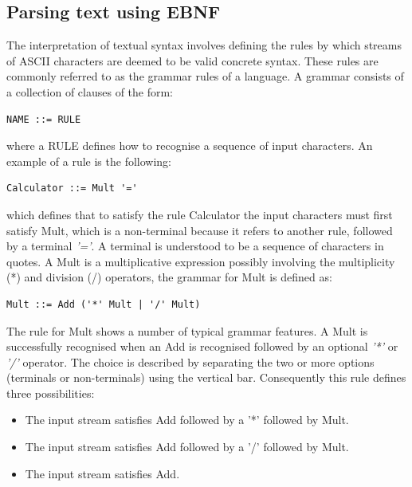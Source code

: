 \subsection{Parsing text using EBNF}

The interpretation of textual syntax involves defining the rules by which streams of ASCII characters are deemed to be valid concrete syntax.  These rules are commonly referred to as the grammar rules of a language.  A grammar consists of a collection of clauses of the form:

\begin{verbatim}
NAME ::= RULE
\end{verbatim}

\noindent where a RULE defines how to recognise a sequence of input characters.  An example of a rule is the following:

\begin{verbatim}
Calculator ::= Mult '='
\end{verbatim}

\noindent which defines that to satisfy the rule Calculator the input characters must first satisfy Mult, which is a non-terminal because it refers to another rule, followed by a terminal \emph{'='}.  A terminal is understood to be a sequence of characters in quotes.  A Mult is a multiplicative expression possibly involving the multiplicity (*) and division (/) operators, the grammar for Mult is defined as:

\begin{verbatim}
Mult ::= Add ('*' Mult | '/' Mult)
\end{verbatim}

The rule for Mult shows a number of typical grammar features.  A Mult is successfully recognised when an Add is recognised followed by an optional \emph{'*'} or \emph{'/'} operator.  The choice is described by separating the two or more options (terminals or non-terminals) using the vertical bar.  Consequently this rule defines three possibilities:

\begin{itemize}

\item The input stream satisfies Add followed by a '*' followed by Mult.
\item The input stream satisfies Add followed by a '/' followed by Mult.
\item The input stream satisfies Add.

\end{itemize}

